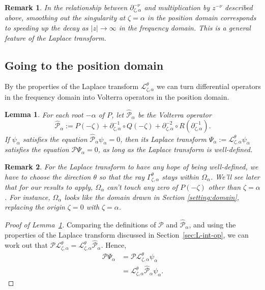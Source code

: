 \documentclass{article}
\theoremstyle{plain}
\newtheorem{lemma}{Lemma}
\newtheorem{rmk}{Remark}
\newcommand{\laplace}{\mathcal{L}}
\newcommand{\fracderiv}[3]{\partial^{#1}_{#2, #3}}
\newcommand{\domain}{\Omega}
\begin{document}
\begin{rmk}
In the relationship between $\fracderiv{-\nu}{\zeta}{\alpha}$ and multiplication by $z^{-\nu}$ described above, smoothing out the singularity at $\zeta = \alpha$ in the position domain corresponds to speeding up the decay as $|z| \to \infty$ in the frequency domain. This is a general feature of the Laplace transform.
\end{rmk}
\subsection{Going to the position domain}
By the properties of the Laplace transform $\laplace_{\zeta,\alpha}^{\theta}$ we can turn differential operators in the frequency domain into Volterra operators in the position domain. 
\begin{lemma}\label{lem:use-dict}
For each root $-\alpha$ of $P$, let $\hat{\mathcal{P}}_{\alpha}$ be the Volterra operator 
\[ \hat{\mathcal{P}}_\alpha:=P(-\zeta)+\partial_{\zeta,\alpha}^{-1}\circ Q(-\zeta)+\partial_{\zeta,\alpha}^{-2}\circ R(\partial_{\zeta,\alpha}^{-1}). \]
If $\psi_\alpha$ satisfies the equation $\hat{\mathcal{P}}_\alpha\psi_\alpha=0$, then its Laplace transform $\Psi_\alpha:=\laplace_{\zeta,\alpha}^{\theta}\psi_\alpha$ satisfies the equation $\mathcal{P}\Psi_\alpha=0$, as long as the Laplace transform is well-defined.
\end{lemma}

\begin{rmk}
For the Laplace transform to have any hope of being well-defined, we have to choose the direction $\theta$ so that the ray $\Gamma_{\zeta, \alpha}^\theta$ stays within $\domain_\alpha$. We'll see later that for our results to apply, $\domain_\alpha$ can't touch any zero of $P(-\zeta)$ other than $\zeta = \alpha$. For instance, $\domain_\alpha$ looks like the domain drawn in Section \ref{setting:domain}, replacing the origin $\zeta=0$ with $\zeta=\alpha$. 
\end{rmk}
\begin{proof}[Proof of Lemma~\ref{lem:use-dict}]
Comparing the definitions of $\mathcal{P}$ and $\hat{\mathcal{P}}_\alpha$, and using the properties of the Laplace transform discussed in Section~\ref{sec:L-int-op}, we can work out that $\mathcal{P} \laplace_{\zeta,\alpha}^\theta = \laplace_{\zeta,\alpha}^\theta \hat{\mathcal{P}}_\alpha$. Hence,
\begin{align*}
\mathcal{P}\Psi_\alpha & = \mathcal{P}\laplace_{\zeta,\alpha}^{\theta}\psi_\alpha \\
& = \laplace_{\zeta,\alpha}^{\theta}\hat{\mathcal{P}}_\alpha\psi_\alpha.
\end{align*}
\end{proof}
\end{document}
